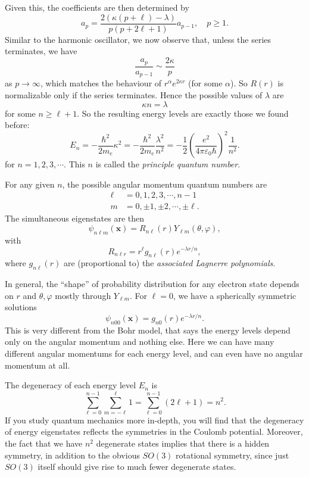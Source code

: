 \documentclass[a4paper]{article}
\begin{document}
Given this, the coefficients are then determined by
\[
  a_p = \frac{2(\kappa (p + \ell) - \lambda)}{p(p + 2\ell + 1)} a_{p - 1}, \quad p \geq 1.
\]
Similar to the harmonic oscillator, we now observe that, unless the series terminates, we have
\[
  \frac{a_p}{a_{p - 1}} \sim \frac{2\kappa}{p}
\]
as $p \to \infty$, which matches the behaviour of $r^\alpha e^{2 \kappa r}$ (for some $\alpha$). So $R(r)$ is normalizable only if the series terminates. Hence the possible values of $\lambda$ are
\[
  \kappa n = \lambda
\]
for some $n \geq \ell + 1$. So the resulting energy levels are exactly those we found before:
\[
  E_n = -\frac{\hbar^2}{2 m_e} \kappa^2 = -\frac{\hbar^2}{2 m_e} \frac{\lambda^2}{n^2} = -\frac{1}{2}\left(\frac{e^2}{4 \pi \varepsilon_0 \hbar}\right)^2 \frac{1}{n^2}.
\]
for $n = 1, 2, 3, \cdots$. This $n$ is called the \emph{principle quantum number}.

For any given $n$, the possible angular momentum quantum numbers are
\begin{align*}
  \ell &= 0, 1, 2, 3, \cdots, n - 1\\
  m &= 0, \pm 1, \pm 2, \cdots, \pm \ell.
\end{align*}
The simultaneous eigenstates are then
\[
  \psi_{n\ell m} (\mathbf{x}) = R_{n\ell}(r)Y_{\ell m}(\theta, \varphi),
\]
with
\[
  R_{n\ell r} = r^\ell g_{n\ell}(r)e^{-\lambda r/n},
\]
where $g_{n\ell}(r)$ are (proportional to) the \emph{associated Lagnerre polynomials}.

In general, the ``shape'' of probability distribution for any electron state depends on $r$ and $\theta, \varphi$ mostly through $Y_{\ell m}$. For $\ell = 0$, we have a spherically symmetric solutions
\[
  \psi_{n00}(\mathbf{x}) = g_{n0}(r) e^{-\lambda r/n}.
\]
This is very different from the Bohr model, that says the energy levels depend only on the angular momentum and nothing else. Here we can have many different angular momentums for each energy level, and can even have no angular momentum at all.

The degeneracy of each energy level $E_n$ is
\[
  \sum_{\ell = 0}^{n - 1} \sum_{m = -\ell}^\ell 1 = \sum_{\ell = 0}^{n - 1} (2\ell + 1) = n^2.
\]
If you study quantum mechanics more in-depth, you will find that the degeneracy of energy eigenstates reflects the symmetries in the Coulomb potential. Moreover, the fact that we have $n^2$ degenerate states implies that there is a hidden symmetry, in addition to the obvious $SO(3)$ rotational symmetry, since just $SO(3)$ itself should give rise to much fewer degenerate states.
\end{document}
